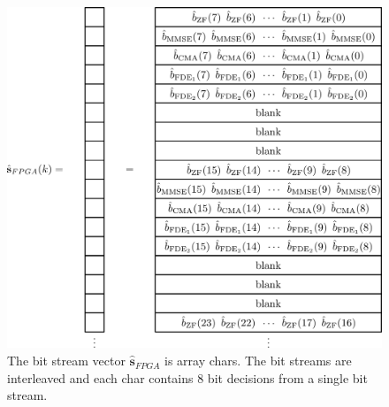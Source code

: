 \begin{figure}
	\centering\includegraphics[width=\textwidth/10*8]{figures/gpu/bit_inter.png}
	\caption{The bit stream vector $\hat{\mathbf{s}}_{FPGA}$ is array chars. The bit streams are interleaved and each char contains 8 bit decisions from a single bit stream.}
	\label{fig:bit_inter}
\end{figure}
 
